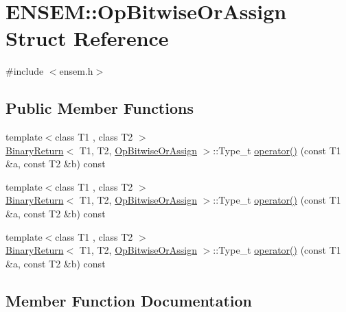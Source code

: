 \hypertarget{structENSEM_1_1OpBitwiseOrAssign}{}\section{E\+N\+S\+EM\+:\+:Op\+Bitwise\+Or\+Assign Struct Reference}
\label{structENSEM_1_1OpBitwiseOrAssign}


{\ttfamily \#include $<$ensem.\+h$>$}

\subsection*{Public Member Functions}
\begin{DoxyCompactItemize}
\item 
{\footnotesize template$<$class T1 , class T2 $>$ }\\\mbox{\hyperlink{structENSEM_1_1BinaryReturn}{Binary\+Return}}$<$ T1, T2, \mbox{\hyperlink{structENSEM_1_1OpBitwiseOrAssign}{Op\+Bitwise\+Or\+Assign}} $>$\+::Type\+\_\+t \mbox{\hyperlink{structENSEM_1_1OpBitwiseOrAssign_afddd4ba26f5d21bc671df619c5c4e33b}{operator()}} (const T1 \&a, const T2 \&b) const
\item 
{\footnotesize template$<$class T1 , class T2 $>$ }\\\mbox{\hyperlink{structENSEM_1_1BinaryReturn}{Binary\+Return}}$<$ T1, T2, \mbox{\hyperlink{structENSEM_1_1OpBitwiseOrAssign}{Op\+Bitwise\+Or\+Assign}} $>$\+::Type\+\_\+t \mbox{\hyperlink{structENSEM_1_1OpBitwiseOrAssign_afddd4ba26f5d21bc671df619c5c4e33b}{operator()}} (const T1 \&a, const T2 \&b) const
\item 
{\footnotesize template$<$class T1 , class T2 $>$ }\\\mbox{\hyperlink{structENSEM_1_1BinaryReturn}{Binary\+Return}}$<$ T1, T2, \mbox{\hyperlink{structENSEM_1_1OpBitwiseOrAssign}{Op\+Bitwise\+Or\+Assign}} $>$\+::Type\+\_\+t \mbox{\hyperlink{structENSEM_1_1OpBitwiseOrAssign_afddd4ba26f5d21bc671df619c5c4e33b}{operator()}} (const T1 \&a, const T2 \&b) const
\end{DoxyCompactItemize}


\subsection{Member Function Documentation}
\mbox{\label{structENSEM_1_1OpBitwiseOrAssign_afddd4ba26f5d21bc671df619c5c4e33b}} 
